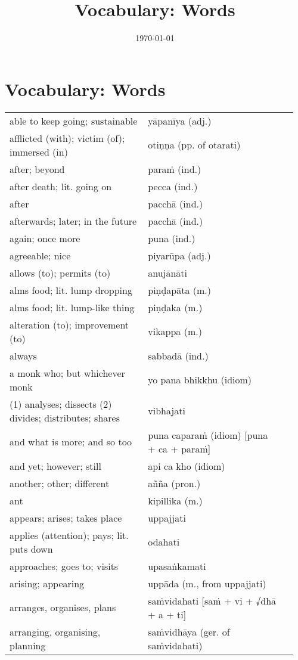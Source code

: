 \documentclass[a5paper]{memoir}
\date{\today}
\title{Vocabulary: Words}
\begin{document}
\chapter{Vocabulary: Words}
\label{sec:org2139963}

\begin{longtable}{L{0.48\linewidth} L{0.48\linewidth} H}
able to keep going; sustainable & yāpanīya (adj.) & \\
afflicted (with); victim (of); immersed (in) & otiṇṇa (pp. of otarati) & \\
after; beyond & paraṁ (ind.) & \\
after death; lit. going on & pecca (ind.) & \\
after & pacchā (ind.) & \\
afterwards; later; in the future & pacchā (ind.) & \\
again; once more & puna (ind.) & \\
agreeable; nice & piyarūpa (adj.) & \\
allows (to); permits (to) & anujānāti & \\
alms food; lit. lump dropping & piṇḍapāta (m.) & \\
alms food; lit. lump-like thing & piṇḍaka (m.) & \\
alteration (to); improvement (to) & vikappa (m.) & \\
always & sabbadā (ind.) & \\
a monk who; but whichever monk & yo pana bhikkhu (idiom) & \\
(1) analyses; dissects (2) divides; distributes; shares & vibhajati & \\
and what is more; and so too & puna caparaṁ (idiom) [puna + ca + paraṁ] & \\
and yet; however; still & api ca kho (idiom) & \\
another; other; different & añña (pron.) & \\
ant & kipillika (m.) & \\
appears; arises; takes place & uppajjati & \\
applies (attention); pays; lit. puts down & odahati & \\
approaches; goes to; visits & upasaṅkamati & \\
arising; appearing & uppāda (m., from uppajjati) & \\
arranges, organises, plans & saṁvidahati [saṁ + vi + √dhā + a + ti] & \\
arranging, organising, planning & saṁvidhāya (ger. of saṁvidahati) & \\

\end{longtable}
\end{document}
